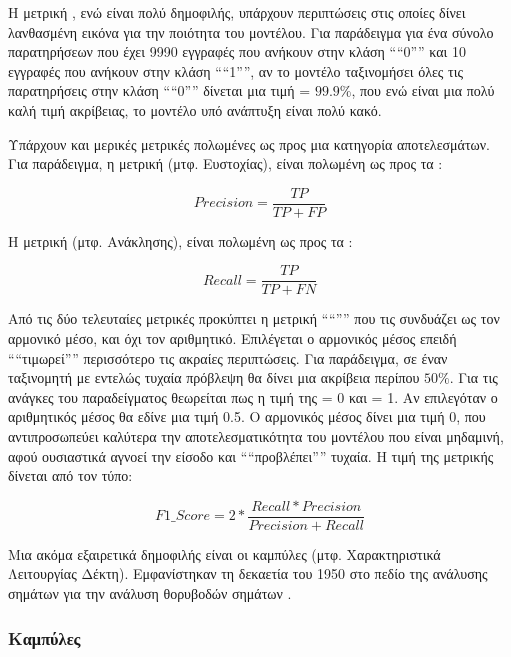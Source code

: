 Η μετρική , ενώ είναι πολύ δημοφιλής, υπάρχουν περιπτώσεις στις οποίες δίνει λανθασμένη εικόνα για την
ποιότητα του μοντέλου. Για παράδειγμα για ένα σύνολο παρατηρήσεων που έχει 9990 εγγραφές
που ανήκουν στην κλάση ````0'''' και 10 εγγραφές που ανήκουν στην κλάση ````1'''', αν το μοντέλο 
ταξινομήσει όλες τις παρατηρήσεις στην κλάση ````0'''' δίνεται μια τιμή  = \(99.9\%\),
που ενώ είναι μια πολύ καλή τιμή ακρίβειας, το μοντέλο υπό ανάπτυξη είναι πολύ κακό.

Υπάρχουν και μερικές μετρικές πολωμένες ως προς μια κατηγορία αποτελεσμάτων. Για παράδειγμα,
η μετρική  (μτφ. Ευστοχίας), είναι πολωμένη ως προς τα :

\begin{equation}
    Precision = \frac{TP}{TP + FP}
\end{equation}

H μετρική  (μτφ. Ανάκλησης), είναι πολωμένη ως προς τα :

\begin{equation}
    Recall = \frac{TP}{TP + FN}
\end{equation}

Από τις δύο τελευταίες μετρικές προκύπτει η μετρική ````'''' που τις συνδυάζει 
ως τον αρμονικό μέσο, και όχι τον αριθμητικό. Επιλέγεται ο αρμονικός μέσος επειδή ````τιμωρεί''''
περισσότερο τις ακραίες περιπτώσεις. Για παράδειγμα, σε έναν ταξινομητή με εντελώς τυχαία
πρόβλεψη θα δίνει μια ακρίβεια περίπου \(50\%\). Για τις ανάγκες του παραδείγματος θεωρείται
πως η τιμή της  = 0 και  = 1. Αν επιλεγόταν ο αριθμητικός μέσος
θα εδίνε μια τιμή 0.5. Ο αρμονικός μέσος δίνει μια τιμή 0, που αντιπροσωπεύει καλύτερα την
αποτελεσματικότητα του μοντέλου που είναι μηδαμινή, αφού ουσιαστικά αγνοεί την είσοδο και
````προβλέπει'''' τυχαία. Η τιμή της μετρικής δίνεται από τον τύπο:

\begin{equation}
    F1\_Score = 2 * \frac{Recall * Precision}{Precision + Recall}
\end{equation}

Μια ακόμα εξαιρετικά δημοφιλής είναι οι καμπύλες  (μτφ. Χαρακτηριστικά Λειτουργίας Δέκτη). Εμφανίστηκαν τη δεκαετία του
1950 στο πεδίο της ανάλυσης σημάτων για την ανάλυση θορυβοδών σημάτων \cite{DataMining}. 

\subsubsection{Καμπύλες }

